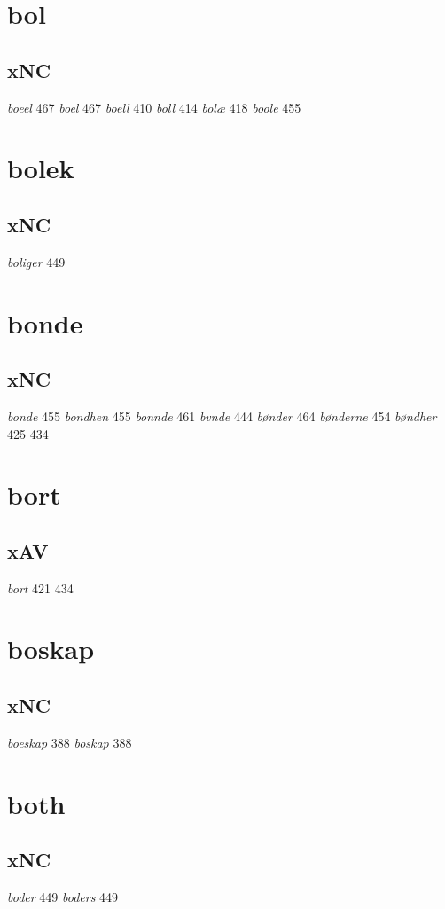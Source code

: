 \documentclass[a4paper,twocolumn]{article}
\begin{document}
\section{bol}
\label{sec:org8a804a0}
\subsection{xNC}
\label{sec:org9e856c3}
\emph{boeel} 467 \emph{boel} 467 \emph{boell} 410 \emph{boll} 414 \emph{bolæ} 418 \emph{boole} 455 
\section{bolek}
\label{sec:org3ba9baf}
\subsection{xNC}
\label{sec:org7daa01f}
\emph{boliger} 449 
\section{bonde}
\label{sec:org7f33b3e}
\subsection{xNC}
\label{sec:org11aba1d}
\emph{bonde} 455 \emph{bondhen} 455 \emph{bonnde} 461 \emph{bvnde} 444 \emph{bønder} 464 \emph{bønderne} 454 \emph{bøndher} 425 434 
\section{bort}
\label{sec:org91a5089}
\subsection{xAV}
\label{sec:orgaf4a61b}
\emph{bort} 421 434 
\section{boskap}
\label{sec:orgb028ace}
\subsection{xNC}
\label{sec:org75cdaf3}
\emph{boeskap} 388 \emph{boskap} 388 
\section{both}
\label{sec:org7d8efbb}
\subsection{xNC}
\label{sec:org0efe15b}
\emph{boder} 449 \emph{boders} 449 
\end{document}

